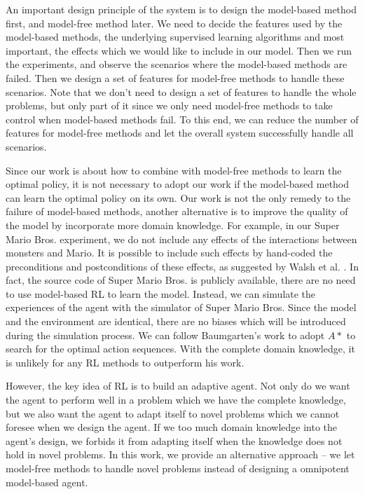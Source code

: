 An important design principle of the system is to design the model-based method first,
and model-free method later. 
We need to decide the features used by the
model-based methods, the underlying supervised learning algorithms and most
important, the effects which we would like to include in our model. Then we
run the experiments, and observe the scenarios where the model-based methods
are failed. 
Then we design a set of features for model-free methods to handle
these scenarios. Note that we don't need to design a set of features to handle
the whole problems, but only part of it since we only need model-free methods
to take control when model-based methods fail. To this end, we can reduce the
number of features for model-free methods and let the overall system
successfully handle all scenarios.

Since our work is about how to combine with model-free methods to learn the optimal policy,
it is not necessary to adopt our work if the model-based method can learn the optimal policy
on its own.
Our work is not the only remedy to the failure of model-based methods,
another alternative is to improve the quality of the model by incorporate more domain knowledge.
For example, in our Super Mario Bros. experiment, we do not include any effects 
of the interactions between monsters and Mario. It is possible to include such effects
by hand-coded the preconditions and postconditions of these effects, as suggested by Walsh et al. \cite{Walsh09}.
In fact, the source code of Super Mario Bros. is publicly available,
there are no need to use model-based RL to learn the model. Instead,
we can simulate the experiences of the agent with the simulator of Super Mario Bros.
Since the model and the environment are identical, there are no biases which will be 
introduced during the simulation process.
We can follow Baumgarten's work \cite{robin09} to adopt $A*$ to search for the optimal action sequences.
With the complete domain knowledge, it is unlikely for any RL methods to outperform his work.

However, the key idea of RL is to build an adaptive agent.
Not only do we want the agent to perform well in a problem which we have the complete knowledge,
but we also want the agent to adapt itself to novel problems which we cannot foresee when we design the agent.
If we too much domain knowledge into the agent's design, we forbids it from adapting 
itself when the knowledge does not hold in novel problems. 
In this work, we provide an alternative approach -- we let model-free methods to 
handle novel problems instead of designing a omnipotent model-based agent.

